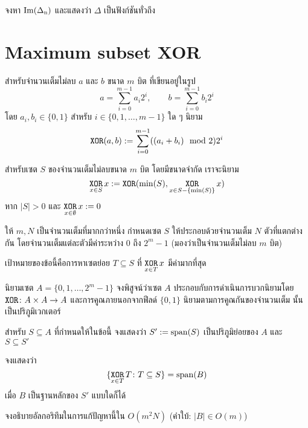 \begin{exercise}
จงหา $\rm{Im}(\Delta_n)$ และแสดงว่า $\Delta$ เป็นฟังก์ชันทั่วถึง
\end{exercise}

\section{Maximum subset XOR}

\begin{definition}
สำหรับจำนวนเต็มไม่ลบ $a$ และ $b$ ขนาด $m$ บิต ที่เขียนอยู่ในรูป
\[
a = \sum_{i=0}^{m-1} a_i 2^i, \qquad b = \sum_{i=0}^{m-1} b_i 2^i
\]
โดย $a_i, b_i \in \{0, 1\}$ สำหรับ $i \in \{0, 1, \dots, m-1\}$ ใด ๆ นิยาม 
\[
\operatorname*{\texttt{XOR}}(a, b) := \sum_{i=0}^{m-1}( (a_i + b_i) \mod 2) 2^i
\]
\end{definition}

\begin{definition}
สำหรับเซต $S$ ของจำนวนเต็มไม่ลบขนาด $m$ บิต โดยมีขนาดจำกัด เราจะนิยาม
\[
\operatorname*{\texttt{XOR}}_{x \in S} x := \operatorname*{\texttt{XOR}}(\min(S), \operatorname*{\texttt{XOR}}_{x \in S - \{\min(S)\}} x)
\]
หาก $|S| > 0$ และ $\operatorname*{\texttt{XOR}}\limits_{x \in \emptyset} x := 0$
\end{definition}

ให้ $m, N$ เป็นจำนวนเต็มที่มากกว่าหนึ่ง กำหนดเซต $S$ ให้ประกอบด้วยจำนวนเต็ม $N$ ตัวที่แตกต่างกัน โดยจำนวนเต็มแต่ละตัวมีค่าระหว่าง $0$ ถึง $2^m-1$ (มองว่าเป็นจำนวนเต็มไม่ลบ $m$ บิต)

เป้าหมายของข้อนี้คือการหาเซตย่อย $T \subseteq S$ ที่ $\operatorname*{\texttt{XOR}}\limits_{x \in T} x$ มีค่ามากที่สุด

\begin{exercise}
นิยามเซต $A = \{0, 1, \dots, 2^m-1\}$ จงพิสูจน์ว่าเซต $A$ ประกอบกับการดำเนินการบวกนิยามโดย $\operatorname*{\texttt{XOR}} \colon A \times A \to A$ และการคูณภายนอกจากฟีลด์ $\{0, 1\}$ นิยามตามการคูณกันของจำนวนเต็ม นั้นเป็นปริภูมิเวกเตอร์
\end{exercise}

\begin{exercise}
สำหรับ $S \subseteq A$ ที่กำหนดให้ในข้อนี้ จงแสดงว่า $S' := \operatorname{span}(S)$ เป็นปริภูมิย่อยของ $A$ และ $S \subseteq S'$
\end{exercise}

\begin{exercise}
จงแสดงว่า
\[
\{\operatorname*{\texttt{XOR}}_{x \in T} T \colon T \subseteq S\} = \operatorname{span}(B)
\]
เมื่อ $B$ เป็นฐานหลักของ $S'$ แบบใดก็ได้
\end{exercise}

\begin{exercise}
จงอธิบายอัลกอริทึมในการแก้ปัญหานี้ใน $O(m^2N)$ (คำใบ้: $|B| \in O(m)$)
\end{exercise}